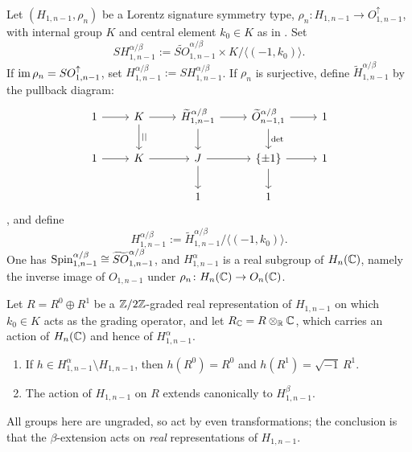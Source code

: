 \documentclass[a4paper,11pt]{article}
\begin{document}
\begin{definition}
    Let $(H_{1,n-1},\rho_n)$ be a Lorentz signature symmetry type, $\rho_n\colon H_{1,n-1}\to
    O^{\uparrow}_{1,n-1}$, with internal group $K$ and central element $k_0\in K$ as in
    . Set
    \[ SH^{\alpha/\beta}_{1,n-1}:=\widetilde{SO}^{\alpha/\beta}_{1,n-1}\times K\big/
       \bigl\langle(-1,k_0)\bigr\rangle. \]
    If ${\rm im}\,\rho_n=SO^{\uparrow}_{1,n-1}$, set $H^{\alpha/\beta}_{1,n-1}
    :=SH^{\alpha/\beta}_{1,n-1}$. If $\rho_n$ is surjective, define
    $\widetilde H^{\alpha/\beta}_{1,n-1}$ by the pullback diagram:
    \begin{equation}
        \begin{tikzcd}
        	1 & K & {\widetilde{H}^{\alpha/\beta}_{1,n-1}} & {\widetilde{O}^{\alpha/\beta}_{n-1,1}} & 1 \\
        	1 & K & J & {\{\pm1\}} & 1 \\
        	&& 1 & 1
        	\arrow[from=1-1, to=1-2]
        	\arrow[from=1-2, to=1-3]
        	\arrow["{||}", from=1-2, to=2-2]
        	\arrow[from=1-3, to=1-4]
        	\arrow[from=1-3, to=2-3]
        	\arrow[from=1-4, to=1-5]
        	\arrow["\det", from=1-4, to=2-4]
        	\arrow[from=2-1, to=2-2]
        	\arrow[from=2-2, to=2-3]
        	\arrow[from=2-3, to=2-4]
        	\arrow[from=2-3, to=3-3]
        	\arrow[from=2-4, to=2-5]
        	\arrow[from=2-4, to=3-4]
        \end{tikzcd}
    \end{equation}
    , and define
    \[ H^{\alpha/\beta}_{1,n-1}:=\widetilde H^{\alpha/\beta}_{1,n-1}\big/
       \bigl\langle(-1,k_0)\bigr\rangle. \]
    One has ${\rm Spin}^{\alpha/\beta}_{1,n-1}\cong\widetilde{SO}^{\alpha/\beta}_{1,n-1}$, and
    $H^{\alpha}_{1,n-1}$ is a real subgroup of $H_n(\mathbb{C})$, namely the inverse image of
    $O_{1,n-1}$ under $\rho_n\colon H_n(\mathbb{C})\to O_n(\mathbb{C})$.
\end{definition}

\begin{statement}
    Let $R=R^0\oplus R^1$ be a $\mathbb{Z}/2\mathbb{Z}$-graded real representation of $H_{1,n-1}$ on which
    $k_0\in K$ acts as the grading operator, and let $R_{\mathbb{C}}=R\otimes_{\mathbb{R}}\mathbb{C}$, which carries an
    action of $H_n(\mathbb{C})$ and hence of $H^{\alpha}_{1,n-1}$.
    \begin{enumerate}
        \item If $h\in H^{\alpha}_{1,n-1}\setminus H_{1,n-1}$, then $h(R^0)=R^0$ and
        $h(R^1)=\sqrt{-1}\,R^1$.
        \item The action of $H_{1,n-1}$ on $R$ extends canonically to $H^{\beta}_{1,n-1}$.
    \end{enumerate}
    All groups here are ungraded, so act by even transformations; the conclusion is that the
    $\beta$-extension acts on {\it real} representations of $H_{1,n-1}$.
\end{statement}
\end{document}
